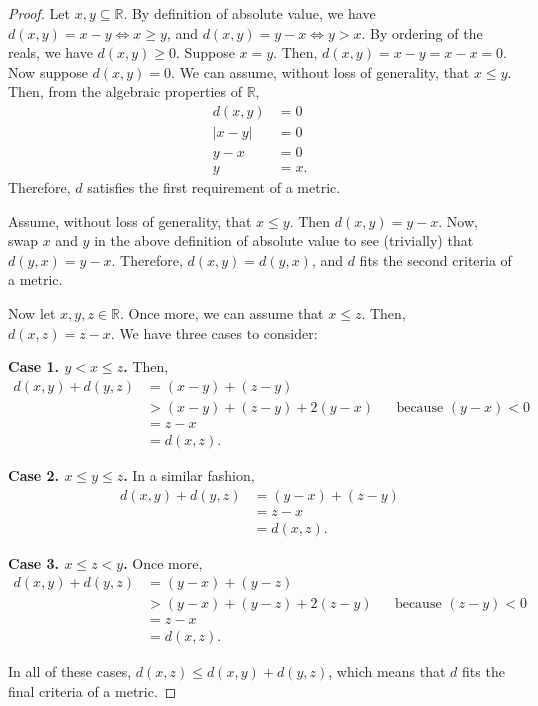 \documentclass[12pt,a4paper]{article}
\theoremstyle{theorem}
\theoremstyle{definition}
\begin{document}
\begin{proof}
Let $x,  y \subseteq \mathbb{R}$.  By definition of absolute value,  we have $d(x, y) = x - y \iff x \geq y$,  and $d(x,  y) = y - x \iff y > x$.  By ordering of the reals,  we have $d(x,  y) \geq 0$.  Suppose $x = y$.  Then,  $d(x,  y) = x - y = x - x = 0$.  Now suppose $d(x, y) = 0$.  We can assume,  without loss of generality,  that $x \leq y$.  Then,  from the algebraic properties of $\mathbb{R}$,  
\begin{align*}
d(x,  y) &= 0\\
|x - y| &= 0\\
y - x &= 0\\
y &= x \text{.}
\end{align*}
Therefore,  $d$ satisfies the first requirement of a metric.

Assume,  without loss of generality,  that $x \leq y$.  Then $d(x,  y) = y - x$.  Now,  swap $x$ and $y$ in the above definition of absolute value to see (trivially) that $d(y,  x) = y - x$. Therefore,  $d(x, y) = d(y, x)$,  and $d$ fits the second criteria of a metric.

Now let $x, y,z \in \mathbb{R}$.  Once more,  we can assume that $x \leq z$.  Then,  $d(x, z) = z - x$.  We have three cases to consider:

\item[\bf{Case 1. } $y < x \leq z$.] Then,  
\begin{align*}
d(x,  y) + d(y,  z) &= (x - y) + (z - y)\\
&> (x - y) + (z - y) + 2(y - x)&& \text{because }(y - x) < 0 \\
&= z - x\\
&= d(x,  z) \text{.}
\end{align*}

\item[\bf{Case 2.} $x \leq y \leq z$. ] In a similar fashion,
\begin{align*}
d(x,  y) + d(y,  z) &= (y - x) + (z - y)\\
&= z - x \\
&= d(x,  z) .
\end{align*}

\item[\bf{Case 3.} $x \leq z < y$. ] Once more,
\begin{align*}
d(x,  y) + d(y,  z) &= (y - x) + (y - z)\\
&> (y - x) + (y - z) + 2(z - y) &&\text{because }(z - y) < 0\\
&= z - x\\
&= d(x,  z).
\end{align*}

In all of these cases,  $d(x,  z) \leq d(x,  y) + d(y,  z)$,  which means that $d$ fits the final criteria of a metric.
\end{proof}
\end{document}
